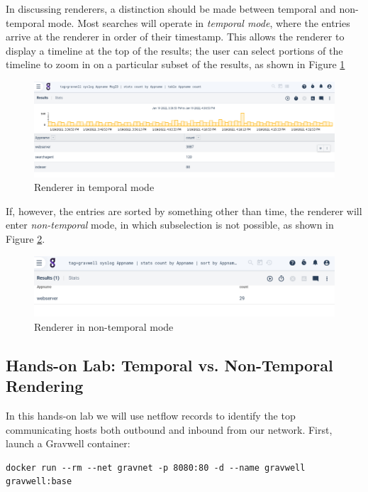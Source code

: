 In discussing renderers, a distinction should be made between temporal
and non-temporal mode. Most searches will operate in \emph{temporal mode},
where the entries arrive at the renderer in order of their
timestamp. This allows the renderer to display a timeline at the top
of the results; the user can select portions of the timeline to zoom in
on a particular subset of the results, as shown in Figure \ref{fig:temporal-render}

\begin{figure}
	\includegraphics[width=0.8\linewidth]{images/temporal-render.png}
	\caption{Renderer in temporal mode}
	\label{fig:temporal-render}
\end{figure}

If, however, the entries are sorted by something other than time, the
renderer will enter \emph{non-temporal} mode, in which subselection is not
possible, as shown in Figure \ref{fig:nontemporal-render}.

\begin{figure}
	\includegraphics[width=0.8\linewidth]{images/nontemporal-render.png}
	\caption{Renderer in non-temporal mode}
	\label{fig:nontemporal-render}
\end{figure}


\subsection{Hands-on Lab: Temporal vs. Non-Temporal Rendering}

In this hands-on lab we will use netflow records to identify the top
communicating hosts both outbound and inbound from our network. First, launch
a Gravwell container:

\begin{Verbatim}[breaklines=true]
docker run --rm --net gravnet -p 8080:80 -d --name gravwell gravwell:base
\end{Verbatim}

